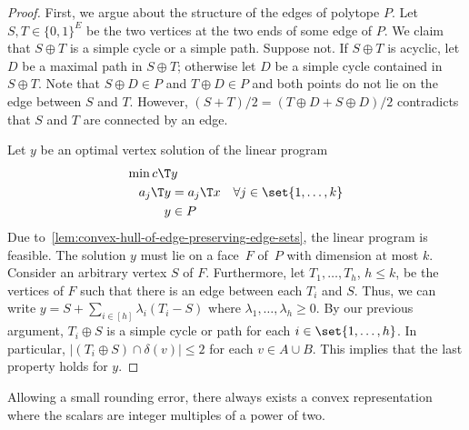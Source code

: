 \documentclass[a4paper,USenglish,cleveref,thm-restate]{lipics-v2021}
\begin{document}
\begin{proof}
    First, we argue about the structure of the edges of polytope $P$.
    Let $S, T\in \{0,1\}^E$ be the two vertices at the two ends of
    some edge of $P$. We claim that $S\oplus T$ is a simple cycle
    or a simple path. Suppose not. If $S\oplus T$ is acyclic, let $D$
    be a maximal path in $S\oplus T$; otherwise let $D$ be a simple cycle
    contained in $S\oplus T$.
    Note that $S \oplus D \in P$ and $T \oplus D\in P$ and both
    points do not lie on the edge between $S$ and $T$.
    However, $(S + T)/2 = (T \oplus D + S \oplus D) / 2$ contradicts
    that $S$ and $T$ are connected by an edge.

    Let $y$ be an optimal vertex solution of the linear program
    \begin{align*}
        \min c\T& y \\
        a_j\T y &= a_j\T x &\forall j \in \set{1,\dotsc,k} \\
        y &\in P
    \end{align*}
    Due to~\cref{lem:convex-hull-of-edge-preserving-edge-sets}, the linear program is feasible.
    The solution $y$ must lie on a face~$F$ of~$P$ with dimension at most $k$.
    Consider an arbitrary vertex $S$ of $F$. Furthermore, let $T_1,\dotsc,T_h$, $h\le k$, be the vertices of $F$ such that there is an edge between each $T_i$ and $S$.
    Thus, we can write $y = S + \sum_{i \in [h]} \lambda_i (T_i - S)$ where $\lambda_1,\dotsc,\lambda_h \ge 0$.
    By our previous argument, $T_i \oplus S$ is a simple cycle or path for each $i\in \set{1,\dotsc,h}$.
    In particular, $|(T_i \oplus S) \cap \delta(v)| \le 2$ for each $v\in A\cup B$. This implies that the last property holds for $y$.
\end{proof}

Allowing a small rounding error, there always exists a convex representation where the scalars are integer multiples of a power of two.

\ScalarRounding*
\end{document}
